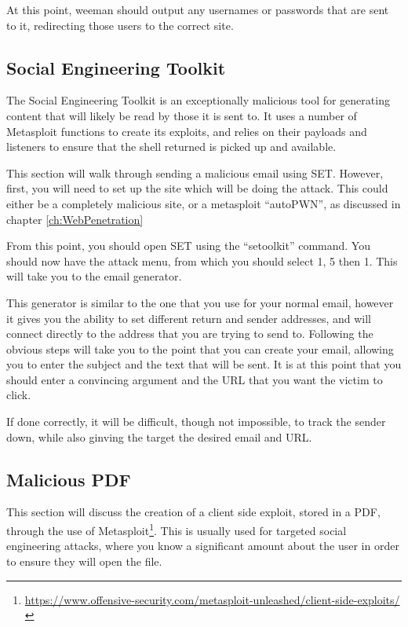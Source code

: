 			At this point, weeman should output any usernames or passwords that are sent to it, redirecting those users to the correct site.
		\subsection{Social Engineering Toolkit}
			The Social Engineering Toolkit is an exceptionally malicious tool for generating content that will likely be read by those it is sent to.
			It uses a number of Metasploit functions to create its exploits, and relies on their payloads and listeners to ensure that the shell returned is picked up and available.

			This section will walk through sending a malicious email using SET.
			However, first, you will need to set up the site which will be doing the attack.
			This could either be a completely malicious site, or a metasploit ``autoPWN'', as discussed in chapter \ref{ch:WebPenetration}

			From this point, you should open SET using the ``setoolkit'' command.
			You should now have the attack menu, from which you should select 1, 5 then 1.
			This will take you to the email generator.

			This generator is similar to the one that you use for your normal email, however it gives you the ability to set different return and sender addresses, and will connect directly to the address that you are trying to send to.
			Following the obvious steps will take you to the point that you can create your email,
			allowing you to enter the subject and the text that will be sent.
			It is at this point that you should enter a convincing argument and the URL that you want the victim to click.

			If done correctly, it will be difficult, though not impossible, to track the sender down, while also ginving the target the desired email and URL.

		\subsection{Malicious PDF}
			This section will discuss the creation of a client side exploit, stored in a PDF, through the use of Metasploit\footnote{\url{https://www.offensive-security.com/metasploit-unleashed/client-side-exploits/}}.
			This is usually used for targeted social engineering attacks, where you know a significant amount about the user in order to ensure they will open the file\cite{MSFU}.

